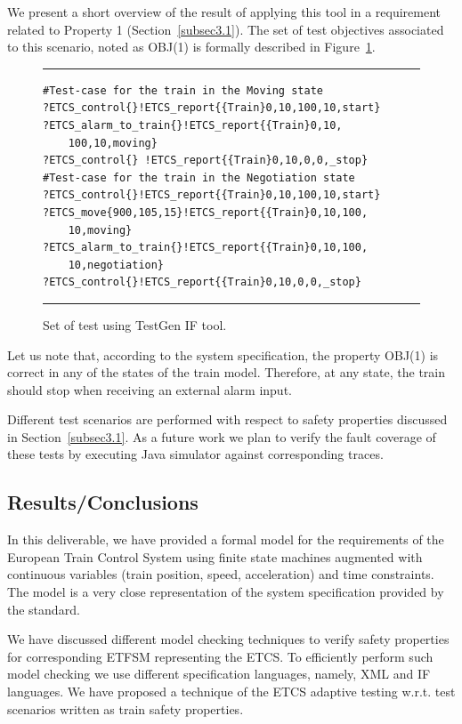 \documentclass{template/openetcs_article}
\begin{document}
We present a short overview of the result of applying this tool in a requirement related to Property 1 (Section~\ref{subsec3.1}). The set of test objectives associated to this scenario, noted as OBJ(1) is formally described in Figure~\ref{set:of:tests}.

\begin{figure}[t]
\hrule
\sspace

\begin{lstlisting}
#Test-case for the train in the Moving state
?ETCS_control{}!ETCS_report{{Train}0,10,100,10,start}
?ETCS_alarm_to_train{}!ETCS_report{{Train}0,10,
	100,10,moving}
?ETCS_control{} !ETCS_report{{Train}0,10,0,0,_stop}
#Test-case for the train in the Negotiation state
?ETCS_control{}!ETCS_report{{Train}0,10,100,10,start}
?ETCS_move{900,105,15}!ETCS_report{{Train}0,10,100,
	10,moving}
?ETCS_alarm_to_train{}!ETCS_report{{Train}0,10,100,
	10,negotiation}
?ETCS_control{}!ETCS_report{{Train}0,10,0,0,_stop}
\end{lstlisting}
\caption{Set of test using TestGen IF tool.\label{set:of:tests}}
\sspace
\hrule

\end{figure}


Let us note that, according to the system specification, the property OBJ(1) is correct in any of the states of the train model. Therefore, at any state, the train should stop when receiving an external alarm input.

Different test scenarios are performed with respect to safety properties discussed in Section~\ref{subsec3.1}. As a future work we plan to verify the fault coverage of these tests by executing Java simulator against corresponding traces.


\subsection{Results/Conclusions}

In this deliverable, we have provided a formal model for the requirements of the European Train Control System using finite state machines augmented with continuous variables (train position, speed, acceleration) and time constraints. The model is a very close representation of the system specification provided by the standard.

We have discussed different model checking techniques to verify safety properties for corresponding ETFSM representing the ETCS. To efficiently perform such model checking we use different specification languages, namely, XML and IF languages.
%
We have proposed a technique of the ETCS adaptive testing w.r.t. test scenarios written as train safety properties. 
\end{document}

